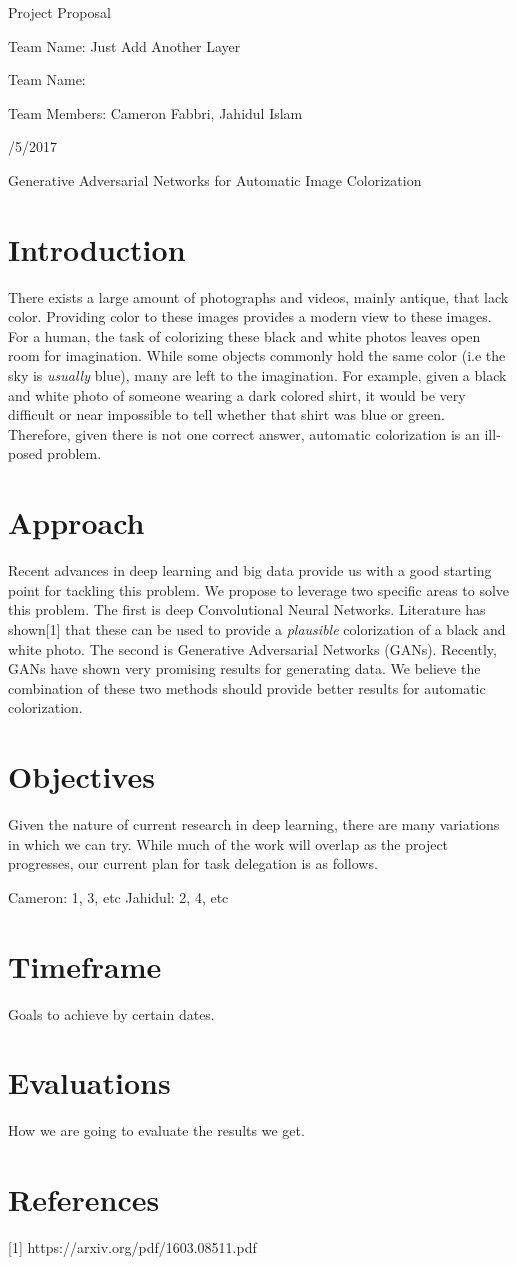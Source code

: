 \documentclass{article}
\begin{document}
\centerline{\sc \large Project Proposal}
\vspace{.5pc}
\centerline{\sc Team Name: Just Add Another Layer}
\centerline{\sc Team Name: }
\centerline{\sc Team Members: Cameron Fabbri, Jahidul Islam}
\centerline{/5/2017}
\vspace{2pc}

\centerline{\sc \large Generative Adversarial Networks for Automatic Image Colorization }

\section{Introduction}
There exists a large amount of photographs and videos, mainly antique, that lack color.
Providing color to these images provides a modern view to these images. For a human,
the task of colorizing these black and white photos leaves open room for imagination. While
some objects commonly hold the same color (i.e the sky is \textit{usually} blue), many are
left to the imagination. For example, given a black and white photo of someone wearing a dark
colored shirt, it would be very difficult or near impossible to tell whether that shirt was
blue or green. Therefore, given there is not one correct answer, automatic colorization is an
ill-posed problem.

\section{Approach}
Recent advances in deep learning and big data provide us with a good starting point for tackling this
problem. We propose to leverage two specific areas to solve this problem. The first is deep Convolutional
Neural Networks. Literature has shown[1] that these can be used to provide a \textit{plausible}
colorization of a black and white photo. The second is Generative Adversarial Networks (GANs). Recently,
GANs have shown very promising results for generating data. We believe the combination of these two
methods should provide better results for automatic colorization.

\section{Objectives}
Given the nature of current research in deep learning, there are many variations in which we
can try. 
While much of the work will overlap as the project progresses, our current plan for task
delegation is as follows.

Cameron: 1, 3, etc
Jahidul: 2, 4, etc

\section{Timeframe}
Goals to achieve by certain dates.


\section{Evaluations}
How we are going to evaluate the results we get.



\section{References}
[1] https://arxiv.org/pdf/1603.08511.pdf
\end{document}
